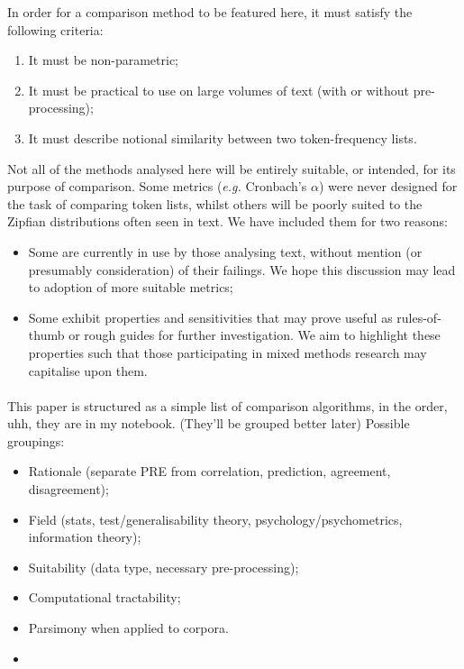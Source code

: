 \documentclass[11pt]{article}
\begin{document}
In order for a comparison method to be featured here, it must satisfy the following criteria:
\begin{enumerate}
\item It must be non-parametric;
\item It must be practical to use on large volumes of text (with or without pre-processing);
\item It must describe notional similarity between two token-frequency lists. %
\end{enumerate}

Not all of the methods analysed here will be entirely suitable, or intended, for its purpose of comparison.  Some metrics (\textsl{e.g.} Cronbach's $\alpha$) were never designed for the task of comparing token lists, whilst others will be poorly suited to the Zipfian distributions often seen in text.  We have included them for two reasons:
\begin{itemize}
\item Some are currently in use by those analysing text, without mention (or presumably consideration) of their failings.  We hope this discussion may lead to adoption of more suitable metrics;
\item Some exhibit properties and sensitivities that may prove useful as rules-of-thumb or rough guides for further investigation.  We aim to highlight these properties such that those participating in mixed methods research may capitalise upon them.
\end{itemize}


\paragraph{}
This paper is structured as a simple list of comparison algorithms, in the order, uhh, they are in my notebook. %
(They'll be grouped better later)
Possible groupings:
\begin{itemize}
    \item Rationale (separate PRE from correlation, prediction, agreement, disagreement);
    \item Field (stats, test/generalisability theory, psychology/psychometrics, information theory);
    \item Suitability (data type, necessary pre-processing);
    \item Computational tractability;
    \item Parsimony when applied to corpora.
    \item %
\end{itemize}
\end{document}
